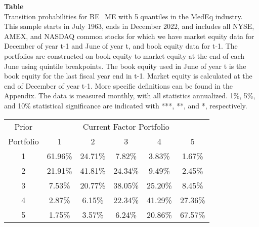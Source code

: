 \begin{table*}[ht!]
\raggedright
{}
\label{tab: transition_probs_BE_ME_MedEq_with_5_quantiles}
\textbf{Table \thetable} \\
Transition probabilities for BE_ME with 5 quantiles in the MedEq industry. \\
\hspace*{1em}This sample starts in July 1963, ends in December 2022, and includes all NYSE, AMEX, and NASDAQ common stocks for which we have market equity data for December of year t-1 and June of year t, and book equity data for t-1. The portfolios are constructed on book equity to market equity at the end of each June using quintile breakpoints.  The book equity used in June of year t is the book equity for the last fiscal year end in t-1.  Market equity is calculated at the end of December of year t-1.  More specific definitions can be found in the Appendix.  The data is measured monthly, with all statistics annualized.  1\%, 5\%, and 10\% statistical significance are indicated with ***, **, and *, respectively. \\
\vspace{0.5em}
\centering
\begin{adjustbox}{max width=\textwidth}
\begin{tabular}{@{}cccccc@{}}
\toprule
Prior & \multicolumn{5}{c}{Current Factor Portfolio} \\
Portfolio & 1 & 2 & 3 & 4 & 5 \\
\midrule
1 & 61.96\% & 24.71\% & 7.82\% & 3.83\% & 1.67\% \\
2 & 21.91\% & 41.81\% & 24.34\% & 9.49\% & 2.45\% \\
3 & 7.53\% & 20.77\% & 38.05\% & 25.20\% & 8.45\% \\
4 & 2.87\% & 6.15\% & 22.34\% & 41.29\% & 27.36\% \\
5 & 1.75\% & 3.57\% & 6.24\% & 20.86\% & 67.57\% \\
\bottomrule
\end{tabular}
\end{adjustbox}
\end{table*}